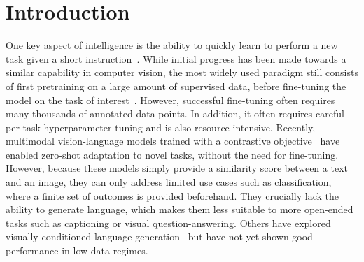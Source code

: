 \section{Introduction}
One key aspect of intelligence is the ability to quickly learn to perform a new task given a short instruction~\citep{griffiths2019doing,markman1989categorization}.
While initial progress has been made towards a similar capability in computer vision,
the most widely used paradigm still consists of first pretraining on a large amount of supervised data, before fine-tuning the model on the task of interest~\citep{lu2019vilbert,wang2021ufo,zellers2022merlot}.
However, successful fine-tuning often requires many thousands of annotated data points.
In addition, it often requires careful per-task hyperparameter tuning and is also resource intensive.
Recently, multimodal vision-language models trained with a contrastive objective~\citep{align,clip} have enabled zero-shot adaptation to novel tasks, without the need for fine-tuning. 
However, because these models simply provide a similarity score between a text and an image, they can only address limited use cases such as classification, where a finite set of outcomes is provided beforehand.
They crucially lack the ability to generate language, which makes them less suitable to more open-ended tasks such as captioning or visual question-answering.
Others have explored visually-conditioned language generation~\citep{wang2021simvlm,tsimpoukelli2021multimodal,cho2021unifying,wang2022unifying,xu2021vlm} but have not yet shown good performance in low-data regimes.

